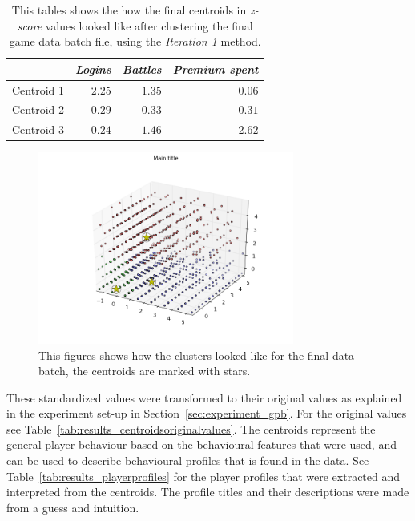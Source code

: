 \begin{table}[h]
\centering
\begin{tabular}{| l | r | r | r |}
    \hline
    & \textit{Logins} & \textit{Battles} & \textit{Premium spent} \\ \hline
    Centroid 1 & $2.25$ & $1.35$ & $0.06$  \\ \hline
    Centroid 2 & $-0.29$ & $-0.33$ & $-0.31$  \\ \hline
    Centroid 3 & $0.24$ & $1.46$ & $2.62$ \\ \hline
\end{tabular}
\caption{This tables shows the how the final centroids in \textit{z-score} values looked like after clustering the final game data batch file, using the \textit{Iteration 1} method.}
\label{tab:results_centroids}
\end{table}


\begin{figure}[here]
\centerline{\includegraphics[trim = 10mm 10mm 10mm 20mm, clip, width=0.75\textwidth]{Figures/experiments/zscoreResultsGamedatasetwooutliers.png}}
\caption{This figures shows how the clusters looked like for the final data batch, the centroids are marked with stars.}
\label{fig:results_zscoredataset}
\end{figure}


These standardized values were transformed to their original values as explained in the experiment set-up in Section~\ref{sec:experiment_gpb}. For the original values see Table~\ref{tab:results_centroidsoriginalvalues}. The centroids represent the general player behaviour based on the behavioural features that were used, and can be used to describe behavioural profiles that is found in the data. See Table~\ref{tab:results_playerprofiles} for the player profiles that were extracted and interpreted from the centroids. The profile titles and their descriptions were made from a guess and intuition.

